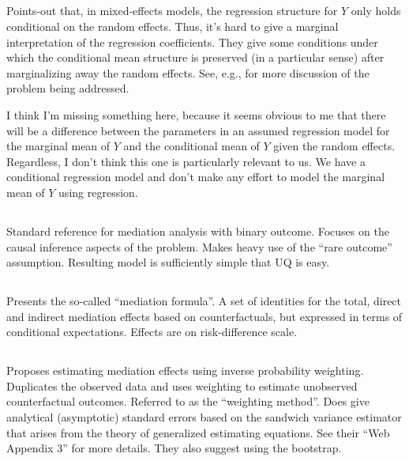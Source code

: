 \documentclass{article}
\begin{document}
\subsection{\citet{Rit04}}

Points-out that, in mixed-effects models, the regression structure for $Y$ only holds conditional on the random effects. Thus, it's hard to give a marginal interpretation of the regression coefficients. They give some conditions under which the conditional mean structure is preserved (in a particular sense) after marginalizing away the random effects. See, e.g., \citet{Neu91} for more discussion of the problem being addressed.

I think I'm missing something here, because it seems obvious to me that there will be a difference between the parameters in an assumed regression model for the marginal mean of $Y$ and the conditional mean of $Y$ given the random effects. Regardless, I don't think this one is particularly relevant to us. We have a conditional regression model and don't make any effort to model the marginal mean of $Y$ using regression.


\subsection{\citet{Van10}}

Standard reference for mediation analysis with binary outcome. Focuses on the causal inference aspects of the problem. Makes heavy use of the ``rare outcome'' assumption. Resulting model is sufficiently simple that UQ is easy.


\subsection{\citet{Pea12}}

Presents the so-called ``mediation formula''. A set of identities for the total, direct and indirect mediation effects based on counterfactuals, but expressed in terms of conditional expectations. Effects are on risk-difference scale.

\subsection{\citet{Lan12}}

Proposes estimating mediation effects using inverse probability weighting. Duplicates the observed data and uses weighting to estimate unobserved counterfactual outcomes. Referred to as the ``weighting method''. Does give analytical (asymptotic) standard errors based on the sandwich variance estimator that arises from the theory of generalized estimating equations. See their ``Web Appendix 3'' for more details. They also suggest using the bootstrap. 
\end{document}

